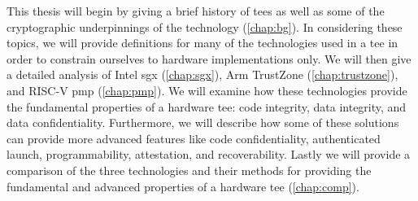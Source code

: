 This thesis will begin by giving a brief history of \glspl{tee} as well as some of the cryptographic underpinnings of the technology (\autoref{chap:bg}). In considering these topics, we will provide definitions for many of the technologies used in a \gls{tee} in order to constrain ourselves to hardware implementations only. We will then give a detailed analysis of Intel \gls{sgx} (\autoref{chap:sgx}), Arm TrustZone (\autoref{chap:trustzone}), and RISC-V \gls{pmp} (\autoref{chap:pmp}). We will examine how these technologies provide the fundamental properties of a hardware \gls{tee}: code integrity, data integrity, and data confidentiality. Furthermore, we will describe how some of these solutions can provide more advanced features like code confidentiality, authenticated launch, programmability, \gls{attestation}, and recoverability. Lastly we will provide a comparison of the three technologies and their methods for providing the fundamental and advanced properties of a hardware \gls{tee} (\autoref{chap:comp}).